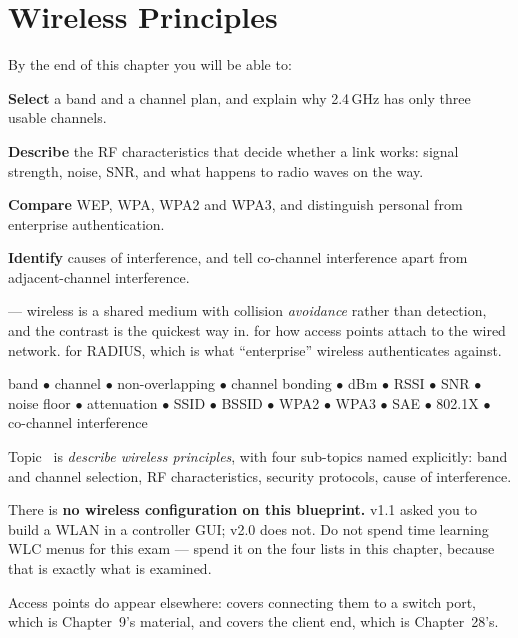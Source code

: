 \chapter{Wireless Principles}\label{ch:wireless}

\begin{outcomes}
By the end of this chapter you will be able to:
\begin{tight}
  \item \textbf{Select} a band and a channel plan, and explain why 2.4\,GHz has
        only three usable channels.
  \item \textbf{Describe} the RF characteristics that decide whether a link
        works: signal strength, noise, SNR, and what happens to radio waves on
        the way.
  \item \textbf{Compare} WEP, WPA, WPA2 and WPA3, and distinguish personal from
        enterprise authentication.
  \item \textbf{Identify} causes of interference, and tell co-channel
        interference apart from adjacent-channel interference.
\end{tight}
\end{outcomes}

\begin{prereq}
 --- wireless is a shared medium with collision \emph{avoidance}
rather than detection, and the contrast is the quickest way in.
 for how access points attach to the wired network.
 for RADIUS, which is what ``enterprise'' wireless authenticates
against.
\end{prereq}

\begin{keyterms}
band $\bullet$ channel $\bullet$ non-overlapping $\bullet$ channel bonding
$\bullet$ dBm $\bullet$ RSSI $\bullet$ SNR $\bullet$ noise floor $\bullet$
attenuation $\bullet$ SSID $\bullet$ BSSID $\bullet$ WPA2 $\bullet$ WPA3
$\bullet$ SAE $\bullet$ 802.1X $\bullet$ co-channel interference
\end{keyterms}

\begin{examnote}
Topic~ is \emph{describe wireless principles}, with four sub-topics named
explicitly:  band and channel selection,  RF characteristics,
 security protocols,  cause of interference.

There is \textbf{no wireless configuration on this blueprint.} v1.1 asked you to
build a WLAN in a controller GUI; v2.0 does not. Do not spend time learning WLC
menus for this exam --- spend it on the four lists in this chapter, because that
is exactly what is examined.

Access points do appear elsewhere:  covers connecting them to a switch
port, which is Chapter~9's material, and  covers the client end, which is
Chapter~28's.
\end{examnote}

